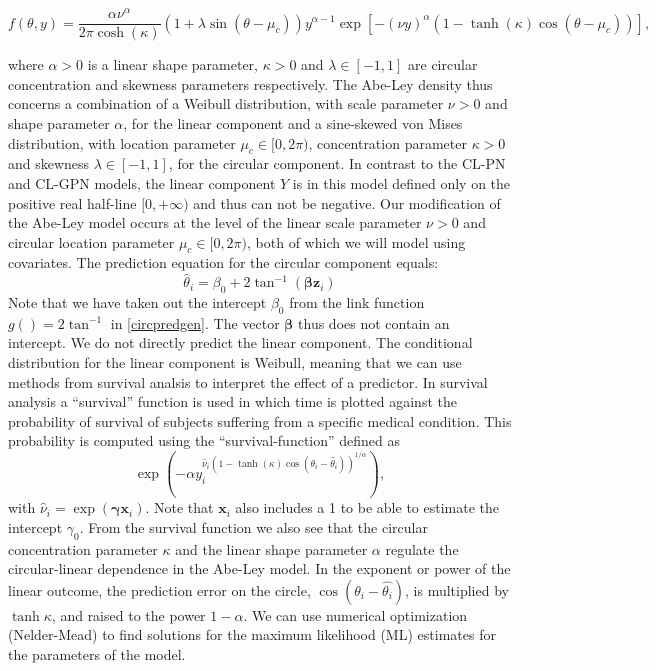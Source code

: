 \documentclass[man,mask]{apa6}
\begin{document}
\begin{equation}\label{WeiSSVMdensity}
f(\theta, y) = \frac{\alpha\nu^\alpha}{2\pi\cosh(\kappa)}
                 (1 +\lambda\sin(\theta - \mu_c))
                 y^{\alpha-1}
                 \exp[-(\nu y)^{\alpha}(1-\tanh(\kappa)\cos(\theta - \mu_c))],
\end{equation}

\noindent where \(\alpha > 0\) is a linear shape parameter, \(\kappa > 0\) and
\(\lambda \in [-1, 1]\) are circular concentration and skewness parameters
respectively. The Abe-Ley density thus concerns a combination of a Weibull
distribution, with scale parameter \(\nu>0\) and shape parameter \(\alpha\), for
the linear component and a sine-skewed von Mises distribution, with location
parameter \(\mu_c\in [0, 2\pi)\), concentration parameter \(\kappa>0\) and
skewness \(\lambda \in [-1,1]\), for the circular component. In contrast to the
CL-PN and CL-GPN models, the linear component \(Y\) is in this model defined
only on the positive real half-line \([0, + \infty)\) and thus can not be
negative. Our modification of the Abe-Ley model occurs at the level of the
linear scale parameter \(\nu>0\) and circular location parameter \(\mu_c\in [0, 2\pi)\), both of which we will model using covariates.\newline
\indent The prediction equation for the circular component equals:
\begin{equation}\label{circpredcAL}
\hat{\theta}_i = \beta_0 + 2\tan^{-1}(\boldsymbol{\beta}\boldsymbol{z}_i)
\end{equation}
Note that we have taken out the intercept \(\beta_0\) from the link function \(g() = 2\tan^{-1}\) in \eqref{circpredgen}. The vector \(\boldsymbol{\beta}\) thus does
not contain an intercept. We do not directly predict the linear component. The
conditional distribution for the linear component is Weibull, meaning that we can
use methods from survival analsis to interpret the effect of a predictor. In
survival analysis a \enquote{survival} function is used in which time is plotted against
the probability of survival of subjects suffering from a specific medical
condition. This probability is computed using the \enquote{survival-function} defined as
\begin{equation}\label{survivalfunc}
\exp(-\alpha
y_i^{\hat{\nu}_i(1-\tanh(\kappa)\cos(\theta_i - \hat{\theta}_i))^{1/\alpha}}),
\end{equation}
\noindent with \(\hat{\nu}_i = \exp(\boldsymbol{\gamma}\boldsymbol{x}_i)\). Note that \(\boldsymbol{x}_i\) also includes a 1 to be able to estimate the intercept \(\gamma_0\). From
the survival function we also see that the circular concentration parameter
\(\kappa\) and the linear shape parameter \(\alpha\) regulate the
circular-linear dependence in the Abe-Ley model. In the exponent or power of the linear outcome, the prediction error on the circle, \(\cos(\theta_i - \hat{\theta_i})\), is multiplied by \(\tanh{\kappa}\), and raised to the power \(1-\alpha\).\newline
\indent We can use numerical optimization (Nelder-Mead) to find solutions for
the maximum likelihood (ML) estimates for the parameters of the model.
\end{document}
